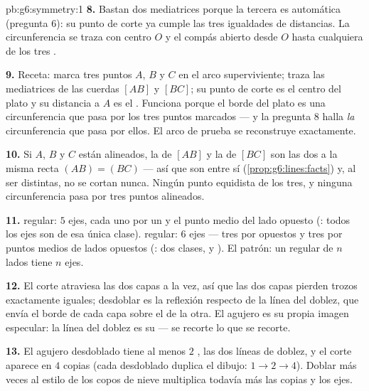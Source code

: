 \begin{solution}{pb:g6:symmetry:1}
\textbf{8.} Bastan dos mediatrices porque la tercera es automática
(pregunta 6): su punto de corte ya cumple las tres
igualdades de distancias. La circunferencia se traza con centro $O$ y
el compás abierto desde $O$ hasta cualquiera de los tres .

\textbf{9.} Receta: marca tres puntos $A$, $B$ y $C$ en el
arco superviviente; traza las mediatrices de las cuerdas
$[AB]$ y $[BC]$; su punto de corte es el centro del
plato y su distancia a $A$ es el . Funciona porque
el borde del plato es una circunferencia que pasa por los tres puntos marcados ---
y la pregunta 8 halla \emph{la} circunferencia que pasa por ellos. El arco
de prueba se reconstruye exactamente.

\textbf{10.} Si $A$, $B$ y $C$ están alineados, la  de
$[AB]$ y la de $[BC]$ son las dos  a la
misma recta $(AB) = (BC)$ --- así que son  entre sí
(\cref{prop:g6:lines:facts}) y, al ser distintas, no se cortan nunca.
Ningún punto equidista de los tres, y ninguna circunferencia pasa
por tres puntos alineados.

\textbf{11.}  regular: $5$ ejes, cada uno por un 
y el punto medio del lado opuesto (: todos los ejes son
de esa única clase).  regular: $6$ ejes --- tres por
 opuestos y tres por puntos medios de lados opuestos
(: dos clases,  y ). El patrón: un 
regular de $n$ lados tiene $n$ ejes.

\textbf{12.} El corte atraviesa las dos capas a la vez, así que las
dos capas pierden trozos exactamente iguales; desdoblar es la
reflexión respecto de la línea del doblez, que envía el borde de cada capa
sobre el de la otra. El agujero es su propia imagen especular: la línea del
doblez es su  --- se recorte lo que se recorte.

\textbf{13.} El agujero desdoblado tiene al menos $2$ , las dos líneas de doblez, y el corte aparece en $4$ copias
(cada desdoblado duplica el dibujo: $1 \to 2 \to 4$). Doblar
más veces al estilo de los copos de nieve multiplica todavía más las copias y los
ejes.


\end{solution}
